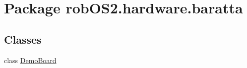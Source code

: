 \hypertarget{namespacerob_o_s2_1_1hardware_1_1baratta}{
\section{Package robOS2.hardware.baratta}
\label{namespacerob_o_s2_1_1hardware_1_1baratta}
}
\subsection*{Classes}
\begin{DoxyCompactItemize}
\item 
class \hyperlink{classrob_o_s2_1_1hardware_1_1baratta_1_1_demo_board}{DemoBoard}
\end{DoxyCompactItemize}
